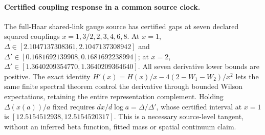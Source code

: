 \paragraph{Certified coupling response in a common source clock.}
The full-Haar shared-link gauge source has certified gaps at seven declared
squared couplings $x=1,3/2,2,3,4,6,8$.  At $x=1$,
$\Delta\in[2.1047137308361,2.1047137308942]$ and
$\Delta'\in[0.1681692139908,0.1681692238994]$; at $x=2$,
$\Delta'\in[1.3640209354770,1.3640209364640]$.
All seven derivative lower bounds are positive.  The exact identity
$H'(x)=H(x)/x-4(2-W_1-W_2)/x^2$ lets the same finite spectral theorem
control the derivative through bounded Wilson expectations, retaining
the entire representation complement.  Holding $\Delta(x(a))/a$ fixed
requires $dx/d\log a=\Delta/\Delta'$, whose certified interval at $x=1$
is $[12.5154512938,12.5154520317]$.  This is a necessary source-level
tangent, without an inferred beta function, fitted mass or spatial
continuum claim.
